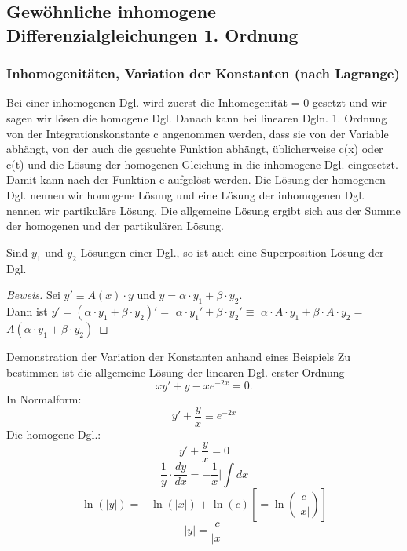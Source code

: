\documentclass[
	11pt, %
]{beamer}
\begin{document}
\subsection{Gew\"ohnliche inhomogene Differenzialgleichungen 1. Ordnung}

\begin{frame}
	\frametitle{Inhomogenit\"aten, Variation der Konstanten (nach Lagrange)}
	Bei einer inhomogenen Dgl. wird zuerst die Inhomegenit\"at = 0 gesetzt und wir sagen wir l\"osen die homogene Dgl. Danach kann bei linearen Dgln. 1. Ordnung von der Integrationskonstante c angenommen werden, dass sie von der Variable abh\"angt, von der auch die gesuchte Funktion abh\"angt, \"ublicherweise c(x) oder c(t) und die L\"osung der homogenen Gleichung in die inhomogene Dgl. eingesetzt. Damit kann nach der Funktion c aufgel\"ost werden. Die L\"osung der homogenen Dgl. nennen wir \alert{homogene L\"osung} und eine L\"osung der inhomogenen Dgl. nennen wir \alert{partikul\"are L\"osung}. Die allgemeine L\"osung ergibt sich aus der Summe der homogenen und der partikul\"aren L\"osung.
\end{frame}
\begin{frame}
	\begin{theorem}[Superpositionsprinzip]
		Sind $y_1$ und $y_2$ L\"osungen einer Dgl., so ist auch eine Superposition L\"osung der Dgl. 
	\end{theorem}
	\begin{proof}[Beweis]
		Sei $y'\equiv A(x)\cdot y$ und $y=\alpha\cdot y_1+\beta\cdot y_2$.\\
		Dann ist $y'=(\alpha\cdot y_1+\beta\cdot y_2)'=$ $\alpha\cdot y_1'+\beta\cdot y_2'\equiv$ $\alpha\cdot A\cdot y_1 +\beta\cdot A\cdot y_2 =$ $A(\alpha\cdot y_1+\beta\cdot y_2)$
	\end{proof}
\end{frame}
\begin{frame}
	\begin{exampleblock}{Demonstration der Variation der Konstanten anhand eines Beispiels}
		Zu bestimmen ist die allgemeine Lösung der linearen Dgl. erster Ordnung
		\begin{equation}
			xy' + y - xe^{-2x} = 0.
		\end{equation}
		In Normalform:
		\begin{equation}
			y' + \frac{y}{x} \equiv e^{-2x}
		\end{equation}
		Die homogene Dgl.:
		\begin{equation}
			y' + \frac{y}{x} = 0
		\end{equation}
		\begin{equation}
			\frac{1}{y}\cdot\frac{dy}{dx} = -\frac{1}{x}\big| \int dx
		\end{equation}
		\begin{equation}
			\ln(\left|y\right|) = -\ln(\left|x\right|)+\ln(c) [=\ln(\frac{c}{\left|x\right|})]
		\end{equation}
		\begin{equation}
			\left|y\right| = \frac{c}{\left|x\right|}
		\end{equation}


	\end{exampleblock}

\end{frame}
\end{document}
